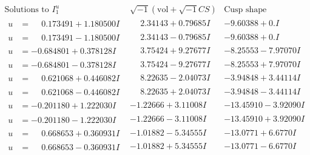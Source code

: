 \documentclass[1p]{elsarticle_modified}
\theoremstyle{definition}
\newcommand{\I}{\sqrt{-1}}
\begin{document}
$$\begin{array}{c|c|c}  
\text{Solutions to }I^u_{1}& \I (\text{vol} + \sqrt{-1}CS) & \text{Cusp shape}\\
 \hline 
\begin{aligned}
u &= \phantom{-}0.173491 + 1.180500 I\end{aligned}
 & \phantom{-}2.34143 + 0.79685 I & -9.60388 + 0. I\phantom{ +0.000000I} \\ \hline\begin{aligned}
u &= \phantom{-}0.173491 - 1.180500 I\end{aligned}
 & \phantom{-}2.34143 - 0.79685 I & -9.60388 + 0. I\phantom{ +0.000000I} \\ \hline\begin{aligned}
u &= -0.684801 + 0.378128 I\end{aligned}
 & \phantom{-}3.75424 + 9.27677 I & -8.25553 - 7.97070 I \\ \hline\begin{aligned}
u &= -0.684801 - 0.378128 I\end{aligned}
 & \phantom{-}3.75424 - 9.27677 I & -8.25553 + 7.97070 I \\ \hline\begin{aligned}
u &= \phantom{-}0.621068 + 0.446082 I\end{aligned}
 & \phantom{-}8.22635 - 2.04073 I & -3.94848 + 3.44114 I \\ \hline\begin{aligned}
u &= \phantom{-}0.621068 - 0.446082 I\end{aligned}
 & \phantom{-}8.22635 + 2.04073 I & -3.94848 - 3.44114 I \\ \hline\begin{aligned}
u &= -0.201180 + 1.222030 I\end{aligned}
 & -1.22666 + 3.11008 I & -13.45910 - 3.92090 I \\ \hline\begin{aligned}
u &= -0.201180 - 1.222030 I\end{aligned}
 & -1.22666 - 3.11008 I & -13.45910 + 3.92090 I \\ \hline\begin{aligned}
u &= \phantom{-}0.668653 + 0.360931 I\end{aligned}
 & -1.01882 - 5.34555 I & -13.0771 + 6.6770 I \\ \hline\begin{aligned}
u &= \phantom{-}0.668653 - 0.360931 I\end{aligned}
 & -1.01882 + 5.34555 I & -13.0771 - 6.6770 I \\ \hline\begin{aligned}

\end{aligned}
\end{array}$$
\end{document}

